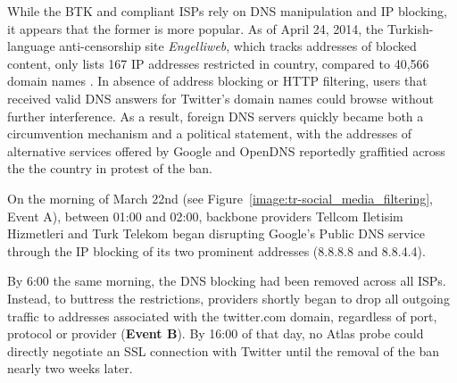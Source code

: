 While the BTK and compliant ISPs rely on DNS manipulation and IP blocking, it
appears that the former is more popular.  As of April 24, 2014, the
Turkish-language anti-censorship site \textit{Engelliweb}, which tracks
addresses of blocked content, only lists 167 IP addresses restricted in
country, compared to 40,566 domain names \cite{engelliweb}.
In absence of address blocking or HTTP filtering, users that received valid DNS
answers for Twitter's domain names could browse without further interference.
As a result, foreign DNS servers quickly became both a circumvention mechanism
and a political statement, with the addresses of alternative services offered
by Google and OpenDNS reportedly graffitied across the the country in protest
of the ban.

On the morning of March 22nd (see Figure~\ref{image:tr-social_media_filtering},
Event A), between 01:00 and 02:00, backbone providers Tellcom Iletisim
Hizmetleri and Turk Telekom began disrupting Google's Public DNS service
through the IP blocking of its two prominent addresses (8.8.8.8 and 8.8.4.4).

By 6:00 the same morning, the DNS blocking had been removed across all ISPs.
Instead, to buttress the restrictions, providers shortly began to drop all
outgoing traffic to addresses associated with the twitter.com domain,
regardless of port, protocol or provider (\textbf{Event B}). By 16:00 of that
day, no Atlas probe could directly negotiate an SSL connection with Twitter
until the removal of the ban nearly two weeks later.

